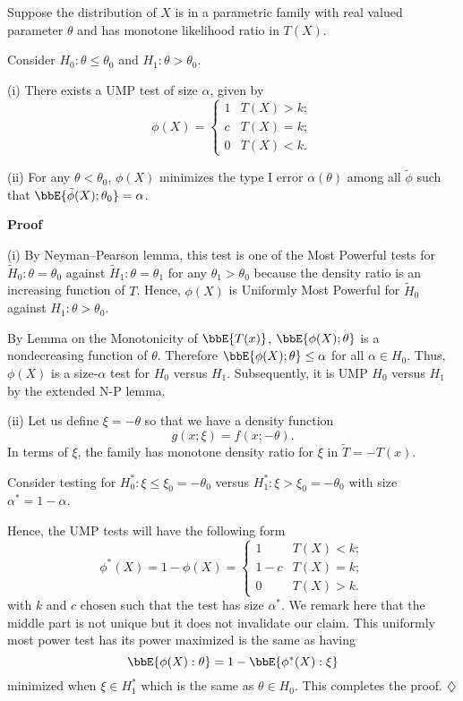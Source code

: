 \begin{theorem}
Suppose the distribution of $X$ is in a parametric family
with real valued parameter $\theta$ and has
monotone likelihood ratio in $T(X)$.

Consider $H_0: \theta \leq \theta_0$ and $H_1: \theta > \theta_0$.

(i) There exists a UMP test of size $\alpha$, given by
\[
\phi(X) =
\left \{
\begin{array}{ll}
1 & T(X) > k;\\
c  & T(X) = k;\\
0 & T(X) < k.
\end{array}
\right .
\]

(ii) For any $\theta < \theta_0$, $\phi(X)$ minimizes 
the type I error $\alpha(\theta)$ among all $\tilde \phi$ such that 
$\bbE\{ \tilde \phi(X); \theta_0\} = \alpha$.
\end{theorem}

\vs\no
{\bf Proof}

(i) By Neyman--Pearson lemma, this test is one of the Most Powerful
tests for
$\tilde H_0: \theta = \theta_0$ against $\tilde H_1: \theta= \theta_1$ for any
$\theta_1 > \theta_0$ because
the density ratio is an increasing function of $T$.
Hence, $\phi(X)$ is Uniformly Most Powerful for $\tilde H_0$ against 
$H_1: \theta > \theta_0$.

By Lemma on the Monotonicity of $\bbE\{T(x)\}$, 
$\bbE\{\phi(X); \theta\}$ is a nondecreasing function of $\theta$.
Therefore $\bbE\{\phi(X); \theta\} \leq \alpha$ for all $\alpha \in H_0$.
Thus, $\phi(X)$ is a size-$\alpha$ test for $H_0$ versus $H_1$.
Subsequently, it is UMP $H_0$ versus $H_1$ by the extended
N-P lemma.

(ii)
Let us define $\xi = - \theta$ so that we have a density function
\[
g(x; \xi) = f(x; - \theta).
\]
In terms of $\xi$, the family has monotone density ratio for $\xi$
in $\tilde T = - T(x)$.

Consider testing for $H^*_0: \xi \leq \xi_0 = - \theta_0$ versus
$H_1^*: \xi > \xi_0 = - \theta_0$ with size $\alpha^* = 1- \alpha$.

Hence, the UMP tests will have the following form
\[
 \phi^*(X) = 1 - \phi(X) = 
\left \{
\begin{array}{ll}
1 & T(X) <  k;\\
1- c  & T(X) = k;\\
0 & T(X) > k.
\end{array}
\right .
\]
with $k$ and $c$ chosen such that the test has size $\alpha^*$.
We remark here that the middle part is not unique but it does not
invalidate our claim.
This uniformly most power test has its power maximized
is the same as having
\[
\bbE\{ \phi(X): \theta\} = 1- \bbE\{\phi^*(X): \xi\}
\]
minimized when $\xi \in H_1^*$ which is the same as $\theta \in H_0$.
This completes the proof.
\hfill{$\diamondsuit$}

